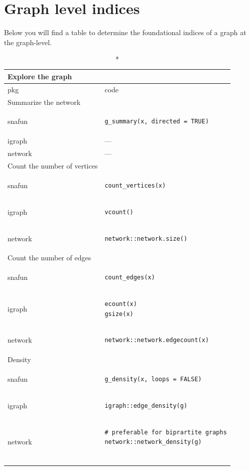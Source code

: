 \documentclass[
]{article}
\begin{document}
\hypertarget{graph-level-indices}{%
\section{Graph level indices}\label{graph-level-indices}}

Below you will find a table to determine the foundational indices of a
graph at the graph-level.

\captionsetup[table]{labelformat=empty,skip=1pt}
\setlength{\LTpost}{0mm}
\begin{longtable}{ll}
\caption*{
{\large Explore the graph}
} \\ 
\toprule
pkg & code \\ 
\midrule
\multicolumn{1}{l}{Summarize the network} \\ 
\midrule
snafun & \begin{verbatim}
g_summary(x, directed = TRUE)
\end{verbatim} \\ 
igraph & — \\ 
network & — \\ 
\midrule
\multicolumn{1}{l}{Count the number of vertices} \\ 
\midrule
snafun & \begin{verbatim}
count_vertices(x)
\end{verbatim} \\ 
igraph & \begin{verbatim}
vcount()
\end{verbatim} \\ 
network & \begin{verbatim}
network::network.size()
\end{verbatim} \\ 
\midrule
\multicolumn{1}{l}{Count the number of edges} \\ 
\midrule
snafun & \begin{verbatim}
count_edges(x)
\end{verbatim} \\ 
igraph & \begin{verbatim}
ecount(x)
gsize(x)
\end{verbatim} \\ 
network & \begin{verbatim}
network::network.edgecount(x)
\end{verbatim} \\ 
\midrule
\multicolumn{1}{l}{Density} \\ 
\midrule
snafun & \begin{verbatim}
g_density(x, loops = FALSE)
\end{verbatim} \\ 
igraph & \begin{verbatim}
igraph::edge_density(g)
\end{verbatim} \\ 
network & \begin{verbatim}
# preferable for biprartite graphs
network::network_density(g)


\end{verbatim}
\end{longtable}
\end{document}
